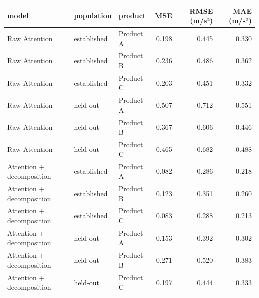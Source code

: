\begin{tabular}{lllrrr}
\toprule
model & population & product & MSE & RMSE (m/s²) & MAE (m/s²) \\
\midrule
Raw Attention & established & Product A & 0.198 & 0.445 & 0.330 \\
Raw Attention & established & Product B & 0.236 & 0.486 & 0.362 \\
Raw Attention & established & Product C & 0.203 & 0.451 & 0.332 \\
Raw Attention & held-out & Product A & 0.507 & 0.712 & 0.551 \\
Raw Attention & held-out & Product B & 0.367 & 0.606 & 0.446 \\
Raw Attention & held-out & Product C & 0.465 & 0.682 & 0.488 \\
Attention + decomposition & established & Product A & 0.082 & 0.286 & 0.218 \\
Attention + decomposition & established & Product B & 0.123 & 0.351 & 0.260 \\
Attention + decomposition & established & Product C & 0.083 & 0.288 & 0.213 \\
Attention + decomposition & held-out & Product A & 0.153 & 0.392 & 0.302 \\
Attention + decomposition & held-out & Product B & 0.271 & 0.520 & 0.383 \\
Attention + decomposition & held-out & Product C & 0.197 & 0.444 & 0.333 \\
\bottomrule
\end{tabular}
